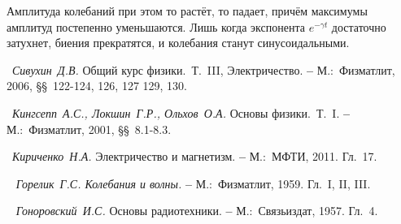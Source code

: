 Амплитуда колебаний при этом то растёт, то падает, причём максимумы амплитуд постепенно уменьшаются. Лишь когда экспонента $e^{-\gamma t}$ достаточно затухнет, биения прекратятся, и колебания станут синусоидальными.
\begin{lab:literature}
	\item~\emph{Сивухин~Д.В.} Общий курс физики.~Т.~III, Электричество. \textbf{--} М.:~Физматлит, 2006, \S\S~122-124, 126, 127 129, 130.
	\item~\emph{Кингсепп~А.С., Локшин~Г.Р., Ольхов~О.А.} Основы физики.~Т.~I. \textbf{--} М.:~Физматлит, 2001, \S\S~8.1-8.3.
	\item~\emph{Кириченко~Н.А.} Электричество и магнетизм. \textbf{--} М.:~МФТИ, 2011. Гл.~17.
	\item~\emph{ Горелик~Г.С. Колебания и волны.} \textbf{--} М.:~Физматлит, 1959. Гл.~I, II, III.
	\item~\emph{ Гоноровский~И.С.} Основы радиотехники. \textbf{--} М.:~Связьиздат, 1957. Гл.~4. 
\end{lab:literature}
